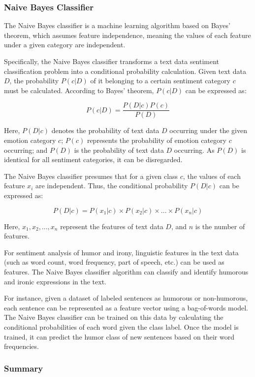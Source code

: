 \documentclass[a4paper]{article}
\begin{document}
\subsubsection{Naive Bayes Classifier}

The Naive Bayes classifier is a machine learning algorithm based on Bayes' theorem, which assumes feature independence, meaning the values of each feature under a given category are independent.

Specifically, the Naive Bayes classifier transforms a text data sentiment classification problem into a conditional probability calculation. Given text data $D$, the probability $P(c|D)$ of it belonging to a certain sentiment category $c$ must be calculated. According to Bayes' theorem, $P(c|D)$ can be expressed as:

$$P(c|D)=\dfrac{P(D|c)P(c)}{P(D)}$$

Here, $P(D|c)$ denotes the probability of text data $D$ occurring under the given emotion category $c$; $P(c)$ represents the probability of emotion category $c$ occurring; and $P(D)$ is the probability of text data $D$ occurring. As $P(D)$ is identical for all sentiment categories, it can be disregarded.

The Naive Bayes classifier presumes that for a given class $c$, the values of each feature $x_i$ are independent. Thus, the conditional probability $P(D|c)$ can be expressed as:

$$P(D|c)=P(x_1|c) \times P(x_2|c) \times ... \times P(x_n|c)$$

Here, $x_1, x_2, ..., x_n$ represent the features of text data $D$, and $n$ is the number of features.

For sentiment analysis of humor and irony, linguistic features in the text data (such as word count, word frequency, part of speech, etc.) can be used as features. The Naive Bayes classifier algorithm can classify and identify humorous and ironic expressions in the text.

For instance, given a dataset of labeled sentences as humorous or non-humorous, each sentence can be represented as a feature vector using a bag-of-words model. The Naive Bayes classifier can be trained on this data by calculating the conditional probabilities of each word given the class label. Once the model is trained, it can predict the humor class of new sentences based on their word frequencies.

\subsubsection{Summary}
\end{document}
